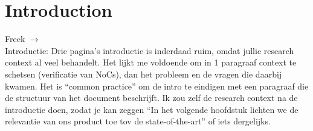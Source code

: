 \chapter*{Introduction}
\begin{tcolorbox}[colback=yellow!30]

Freek $\rightarrow$ \\ 
Introductie: Drie pagina's introductie is inderdaad ruim, omdat jullie research context al veel behandelt. Het lijkt me voldoende om in 1 paragraaf context te schetsen (verificatie van NoCs), dan het probleem en de vragen die daarbij kwamen. Het is ``common practice'' om de intro te eindigen met een paragraaf die de structuur van het document beschrijft. Ik zou zelf de research context na de introductie doen, zodat je kan zeggen ``In het volgende hoofdstuk lichten we de relevantie van ons product toe tov de state-of-the-art'' of iets dergelijks.

\end{tcolorbox}




